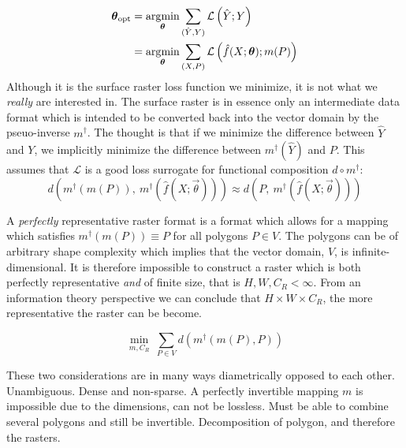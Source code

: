 \begin{description}[style=nextline]
    \begin{align*}
      \boldsymbol{\theta}_{\mathrm{opt}}
      &=
      \operatorname*{\arg\!\min}_{\boldsymbol{\theta}}
      \sum_{(\hat{Y}, Y)}
      \mathcal{L}\left(
        \hat{Y};
        Y
      \right)
      \\
      &=
      \operatorname*{\arg\!\min}_{\boldsymbol{\theta}}
      \sum_{(X, P)}
      \mathcal{L}\left(
        \hat{f}(X; \boldsymbol{\theta});
        m(P)
      \right)
    \end{align*}
    Although it is the surface raster loss function we minimize, it is not what we \emph{really} are interested in.
    The surface raster is in essence only an intermediate data format which is intended to be converted back into the vector domain by the pseuo-inverse $m^{\dagger}$.
    The thought is that if we minimize the difference between $\hat{Y}$ and $Y$, we implicitly minimize the difference between $m^{\dagger}(\hat{Y})$ and $P$.
    This assumes that $\mathcal{L}$ is a good loss surrogate for functional composition $d \circ m^{\dagger}$:
    \begin{equation*}
      d\left(
        m^{\dagger}(m(P)),~
        m^{\dagger}(\hat{f}(X; \vec{\theta}))
      \right)
      \approx
      d\left(
        P,~
        m^{\dagger}(\hat{f}(X; \vec{\theta}))
      \right)
    \end{equation*}
\end{description}

A \emph{perfectly} representative raster format is a format which allows for a mapping which satisfies $m^{\dagger}(m(P)) \equiv P$ for all polygons $P \in V$.
The polygons can be of arbitrary shape complexity which implies that the vector domain, $V$, is infinite-dimensional.
It is therefore impossible to construct a raster which is both perfectly representative \emph{and} of finite size, that is $H, W, C_R < \infty$.
From an information theory perspective we can conclude that $H \times W \times C_R$, the more representative the raster can be become.

\begin{equation*}
  \min_{m, C_R}~
    \sum_{P \in V}
    d\left(
      m^{\dagger}(m(P), P)
    \right)
\end{equation*}

These two considerations are in many ways diametrically opposed to each other.
Unambiguous. Dense and non-sparse.
A perfectly invertible mapping $m$ is impossible due to the dimensions, can not be lossless.
Must be able to combine several polygons and still be invertible.
Decomposition of polygon, and therefore the rasters.

